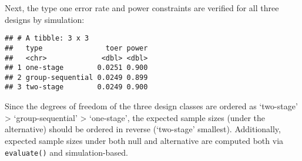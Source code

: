 \documentclass[
]{book}
\newenvironment{Shaded}{\begin{snugshade}}{\end{snugshade}}
\newcommand{\DataTypeTok}[1]{\textcolor[rgb]{0.13,0.29,0.53}{#1}}
\newcommand{\DecValTok}[1]{\textcolor[rgb]{0.00,0.00,0.81}{#1}}
\newcommand{\FloatTok}[1]{\textcolor[rgb]{0.00,0.00,0.81}{#1}}
\newcommand{\KeywordTok}[1]{\textcolor[rgb]{0.13,0.29,0.53}{\textbf{#1}}}
\newcommand{\NormalTok}[1]{#1}
\newcommand{\OperatorTok}[1]{\textcolor[rgb]{0.81,0.36,0.00}{\textbf{#1}}}
\newcommand{\StringTok}[1]{\textcolor[rgb]{0.31,0.60,0.02}{#1}}
\begin{document}
Next, the type one error rate and power constraints are verified
for all three designs by simulation:

\begin{Shaded}
\end{Shaded}

\begin{verbatim}
## # A tibble: 3 x 3
##   type               toer power
##   <chr>             <dbl> <dbl>
## 1 one-stage        0.0251 0.900
## 2 group-sequential 0.0249 0.899
## 3 two-stage        0.0249 0.900
\end{verbatim}

Since the degrees of freedom of the three design classes are ordered as
`two-stage' \textgreater{} `group-sequential' \textgreater{} `one-stage',
the expected sample sizes (under the alternative) should be ordered
in reverse (`two-stage' smallest).
Additionally, expected sample sizes under both null and alternative
are computed both via \texttt{evaluate()} and simulation-based.
\end{document}

